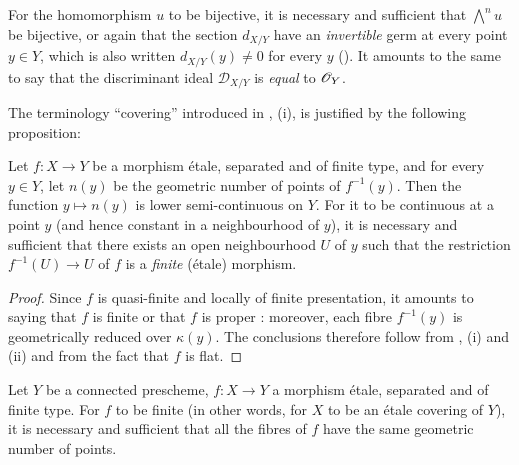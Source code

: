 For the homomorphism $u$ to be bijective, it is necessary and sufficient that $\bigwedge^n u$ be bijective, or again that the section $d_{X/Y}$ have an \emph{invertible} germ at every point $y\in Y$, which is also written $d_{X/Y}(y)\neq 0$ for every $y$ ().
It amounts to the same to say that the discriminant ideal $\mathscr{D}_{X/Y}$ is \emph{equal} to $\mathscr{O}_Y$.

The terminology ``covering'' introduced in , (i), is justified by the following proposition:

\begin{proposition}[18.2.8]
\label{IV.18.2.8}
Let $f:X\to Y$ be a morphism \'etale, separated and of finite type, and for every $y\in Y$, let $n(y)$ be the geometric number of points of $f^{-1}(y)$.
Then the function $y\mapsto n(y)$ is lower semi-continuous on $Y$.
For it to be continuous at a point $y$ (and hence constant in a neighbourhood of $y$), it is necessary and sufficient that there exists an open neighbourhood $U$ of $y$ such that the restriction $f^{-1}(U)\to U$ of $f$ is a \emph{finite} (\'etale) morphism.
\end{proposition}

\begin{proof}
Since $f$ is quasi-finite  and locally of finite presentation, it amounts to saying that $f$ is finite or that $f$ is proper :
moreover, each fibre $f^{-1}(y)$ is geometrically reduced over $\kappa(y)$.
The conclusions therefore follow from , (i) and (ii) and from the fact that $f$ is flat.
\end{proof}

\begin{corollary}[18.2.9]
\label{IV.18.2.9}
Let $Y$ be a connected prescheme, $f:X\to Y$ a morphism \'etale, separated and of finite type.
For $f$ to be finite (in other words, for $X$ to be an \'etale covering of $Y$), it is necessary and sufficient that all the fibres of $f$ have the same geometric number of points.
\end{corollary}

